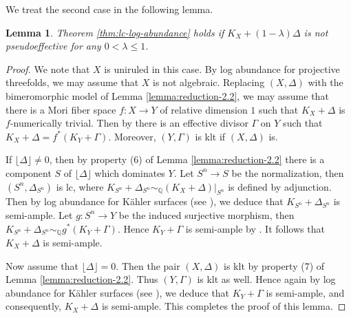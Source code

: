 \documentclass[12pt]{amsart}
\newcommand{\mbQ}{\mathbb{Q}}
\newcommand{\<}{\leq}
\def\>{\geq}
\newcommand{\lrd}{\lfloor}
\newcommand{\rrd}{\rfloor}
\newtheorem{lemma}[theorem]{Lemma}
\theoremstyle{remark}
\theoremstyle{definition}
\theoremstyle{definition}
\numberwithin{equation}{section}
\theoremstyle{definition}
\theoremstyle{definition}
\def\ver{\operatorname{\ver}}
\def\ver{\operatorname{\textsubscript{\rm ver}}}
\begin{document}
We treat the second case in the following lemma. 




\begin{lemma}
    \label{lemma:main-thm-2}
 Theorem \ref{thm:lc-log-abundance} holds if  $K_X+(1-\lambda)\Delta$ is not pseudoeffective for any  $0<\lambda \< 1$. 
\end{lemma}

\begin{proof}  
We note that $X$ is uniruled in this case.  
By log abundance for projective  threefolds, we may assume that $X$ is not algebraic. 
Replacing $(X,\Delta)$ with the bimeromorphic model of Lemma \ref{lemma:reduction-2.2}, we may assume that 
there is a Mori fiber space $f\colon X\to Y$ of relative dimension $1$ such that $K_X+\Delta$ is $f$-numerically trivial. 
Then by \cite[Theorem 9.5]{DasOu2022} there is an effective divisor $\Gamma$ on $Y$ such that $K_X+\Delta = f^*(K_Y+\Gamma)$. 
Moreover, $(Y,\Gamma)$ is klt if $(X, \Delta)$ is.  


If $\lfloor \Delta \rfloor\neq 0$, then by property (6) of Lemma \ref{lemma:reduction-2.2}  there is a component $S$ of $\lrd \Delta\rrd$ which dominates $Y$. Let $S^n\to S$ be the normalization, then $(S^n, \Delta_{S^n})$ is lc, where $K_{S^n}+\Delta_{S^n}\sim_{\mbQ}(K_X+\Delta)|_{S^n}$ is defined by adjunction. 
Then by log abundance for K\"ahler surfaces (see \cite[Theorem 6.3]{DasOu2022}), 
we deduce that $K_{S^n}+\Delta_{S^n}$ is semi-ample. Let $g:S^n\to Y$ be the induced surjective morphism, then $K_{S^n}+\Delta_{S^n}\sim_{\mbQ} g^*(K_Y+\Gamma)$. Hence $K_Y+\Gamma$ is semi-ample by \cite[Lemma 2.6]{DasOu2022}. 
It  follows that $K_X+\Delta$ is semi-ample. 

Now assume that  $\lrd \Delta\rrd=0$. 
Then the pair   $(X,\Delta)$ is klt by property (7) of Lemma \ref{lemma:reduction-2.2}. 
Thus   $(Y,\Gamma)$ is  klt as well. 
Hence again by log abundance for K\"ahler surfaces (see \cite[Theorem 6.3]{DasOu2022}), we deduce that $K_Y+\Gamma$ is semi-ample, and consequently, $K_X+\Delta$ is semi-ample.  
This completes the proof of this lemma. 
\end{proof}

\end{document}
